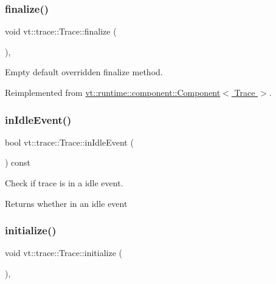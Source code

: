 \subsubsection{\texorpdfstring{finalize()}{finalize()}}
{\footnotesize\ttfamily void vt\+::trace\+::\+Trace\+::finalize (\begin{DoxyParamCaption}{ }\end{DoxyParamCaption})\hspace{0.3cm}{\ttfamily [override]}, {\ttfamily [virtual]}}



Empty default overridden finalize method. 



Reimplemented from \hyperlink{structvt_1_1runtime_1_1component_1_1_component_a098e362de01af6054e5491fba671a959}{vt\+::runtime\+::component\+::\+Component$<$ Trace $>$}.

\mbox{\label{structvt_1_1trace_1_1_trace_a1e7429d95dbddd9f235a02800d158d36}} 
\subsubsection{\texorpdfstring{in\+Idle\+Event()}{inIdleEvent()}}
{\footnotesize\ttfamily bool vt\+::trace\+::\+Trace\+::in\+Idle\+Event (\begin{DoxyParamCaption}{ }\end{DoxyParamCaption}) const}



Check if trace is in a idle event. 

\begin{DoxyReturn}{Returns}
whether in an idle event 
\end{DoxyReturn}
\mbox{\label{structvt_1_1trace_1_1_trace_a24019edd964c0a307008f8d6a0f1f825}} 
\subsubsection{\texorpdfstring{initialize()}{initialize()}}
{\footnotesize\ttfamily void vt\+::trace\+::\+Trace\+::initialize (\begin{DoxyParamCaption}{ }\end{DoxyParamCaption})\hspace{0.3cm}{\ttfamily [override]}, {\ttfamily [virtual]}}




